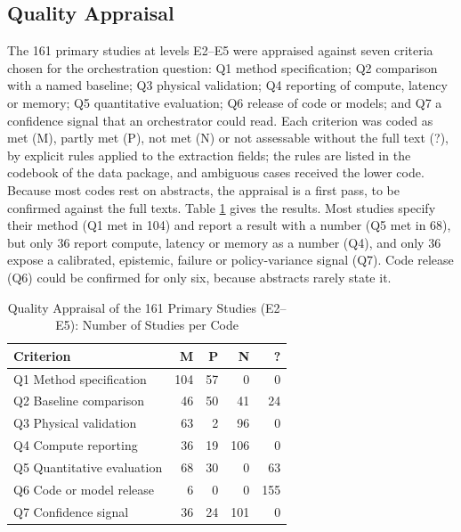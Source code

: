 \documentclass[journal]{IEEEtran}
\begin{document}
\subsection{Quality Appraisal}\label{sec:appraisal}
The 161 primary studies at levels E2--E5 were appraised against seven criteria chosen for the orchestration question: Q1 method specification; Q2 comparison with a named baseline; Q3 physical validation; Q4 reporting of compute, latency or memory; Q5 quantitative evaluation; Q6 release of code or models; and Q7 a confidence signal that an orchestrator could read. Each criterion was coded as met (M), partly met (P), not met (N) or not assessable without the full text (?), by explicit rules applied to the extraction fields; the rules are listed in the codebook of the data package, and ambiguous cases received the lower code. Because most codes rest on abstracts, the appraisal is a first pass, to be confirmed against the full texts. Table \ref{tab:appraisal} gives the results. Most studies specify their method (Q1 met in 104) and report a result with a number (Q5 met in 68), but only 36 report compute, latency or memory as a number (Q4), and only 36 expose a calibrated, epistemic, failure or policy-variance signal (Q7). Code release (Q6) could be confirmed for only six, because abstracts rarely state it.

\begin{table}[!t]
\centering
\caption{Quality Appraisal of the 161 Primary Studies (E2--E5): Number of Studies per Code}\label{tab:appraisal}%
\footnotesize
\begin{tabular}{@{}lrrrr@{}}
\toprule
\textbf{Criterion} & \textbf{M} & \textbf{P} & \textbf{N} & \textbf{?} \\ \midrule
Q1 Method specification & 104 & 57 & 0 & 0 \\
Q2 Baseline comparison & 46 & 50 & 41 & 24 \\
Q3 Physical validation & 63 & 2 & 96 & 0 \\
Q4 Compute reporting & 36 & 19 & 106 & 0 \\
Q5 Quantitative evaluation & 68 & 30 & 0 & 63 \\
Q6 Code or model release & 6 & 0 & 0 & 155 \\
Q7 Confidence signal & 36 & 24 & 101 & 0 \\
\bottomrule
\end{tabular}
\end{table}
\end{document}
